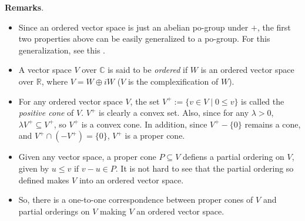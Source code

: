 \documentclass[12pt]{article}
\begin{document}
\textbf{Remarks}.  
\begin{itemize}
\item
Since an ordered vector space is just an abelian po-group under $+$, the first two properties above can be easily generalized to a po-group.  For this generalization, see this .
\item
A vector space $V$ over $\mathbb{C}$ is said to be \emph{ordered} if $W$ is an ordered vector space over $\mathbb{R}$, where $V=W\oplus iW$ ($V$ is the complexification of $W$).
\item
For any ordered vector space $V$, the set $V^+:=\lbrace v\in V\mid 0\le v\rbrace$ is called the \emph{positive cone} of $V$.  $V^+$ is clearly a convex set.  Also, since for any $\lambda>0$, $\lambda V^+\subseteq V^+$, so $V^+$ is a convex cone.  In addition, since $V^+-\lbrace 0 \rbrace$ remains a cone, and $V^+\cap (-V^+)=\lbrace 0\rbrace$, $V^+$ is a proper cone.
\item
Given any vector space, a proper cone $P\subseteq V$ defiens a partial ordering on $V$, given by $u\le v$ if $v-u\in P$.  It is not hard to see that the partial ordering so defined makes $V$ into an ordered vector space.
\item
So, there is a one-to-one correspondence between proper cones of $V$ and partial orderings on $V$ making $V$ an ordered vector space.
\end{itemize}
\end{document}
